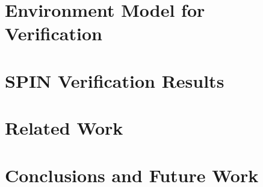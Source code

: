 \documentclass[conference]{IEEEtran}
\begin{document}
\section{Environment Model for Verification}
\label{sec:env}


\section{SPIN Verification Results}
\label{sec:results}


\section{Related Work}


\section{Conclusions and Future Work}



{\small 
}
\end{document}
